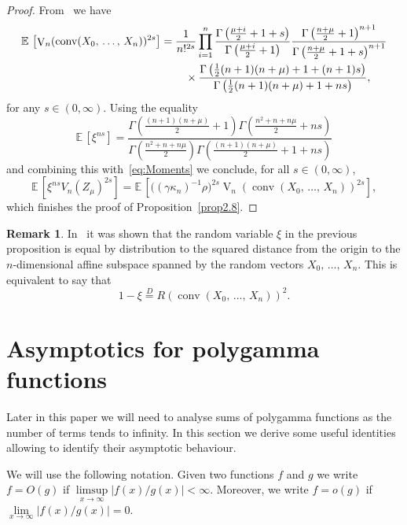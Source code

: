 \documentclass[10pt]{amsart}
\theoremstyle{definition}\newtheorem{defi}[theo]{Definition}\newtheorem{rema}[theo]{Remark}\newtheorem{exam}[theo]{Example}\newtheorem{exem}[theo]{Example}\newtheorem{nota}[theo]{Notation}
\newcommand{\EE}{\mathbb{E}\,}
\newcommand{\V}{\mathop{\mathrm{V}}\nolimits}
\newcommand{\eqdistr}{\stackrel{D}{=}}
\newcommand{\conv}{\mathop{\mathrm{conv}}\nolimits}
\begin{document}
\begin{proof}
From~\cite[Theorem~2.3]{GKT17} we have
\begin{align*}
\EE\left[\V_n(\conv(X_0,\,\ldots,\,X_n))^{2s}\right]&=\frac{1}{n!^{2s}}\prod\limits_{i=1}^n\frac{\Gamma\left(\frac{\mu+i}{2}+1+s\right)}{\Gamma\left(\frac{\mu+i}{2}+1\right)}\frac{\Gamma\left(\frac{n+\mu}{2}+1\right)^{n+1}}{\Gamma\left(\frac{n+\mu}{2}+1+s\right)^{n+1}}\\
&\mkern40mu\times\frac{\Gamma\left(\frac{1}{2}(n+1)(n+\mu)+1+(n+1)s\right)}{\Gamma\left(\frac{1}{2}(n+1)(n+\mu)+1+ns\right)},
\end{align*}
for any $s\in(0,\infty)$. Using the equality
\[
\EE[\xi^{ns}]=\frac{\Gamma\left(\frac{(n+1)(n+\mu)}{2}+1\right)\Gamma\left(\frac{n^2+n+n\mu}{2}+ns\right)}{\Gamma\left(\frac{n^2+n+n\mu}{2}\right)\Gamma\left(\frac{(n+1)(n+\mu)}{2}+1+ns\right)}
\]
and combining this with~\eqref{eq:Moments} we conclude, for all $s\in(0,\infty)$,
\[
\EE\left[\xi^{ns}V_n(Z_{\mu})^{2s}\right]=\EE\left[\big((\gamma\kappa_n)^{-1}\rho\big)^{2s}\V_n\left(\conv(X_0,\,\ldots,\,X_n)\right)^{2s}\right],
\]
which finishes the proof of Proposition~\ref{prop2.8}.
\end{proof}

\begin{rema}\label{rema2.9}
In~\cite[Theorem~2.7]{GKT17} it was shown that the random variable $\xi$ in the previous proposition is equal by distribution to the squared distance from the origin to the $n$-dimensional affine subspace spanned by the random vectors $X_0,\,\ldots,\,X_n$. This is equivalent to say that
\[
1-\xi\eqdistr R\left(\conv(X_0,\,\ldots,\,X_n)\right)^2.
\]
\end{rema}



\section{Asymptotics for polygamma functions}\label{sec:polygamma}

Later in this paper we will need to analyse sums of polygamma functions as the number of terms tends to infinity. In this section we derive some useful identities allowing to identify their asymptotic behaviour.

We will use the following notation. Given two functions $f$ and $g$ we write $f=O(g)$ if $\limsup\limits_{x\to\infty}|f(x)/g(x)|<\infty$. Moreover, we write $f=o(g)$ if $\lim\limits_{x\to\infty}|f(x)/g(x)|=0$.
\end{document}
